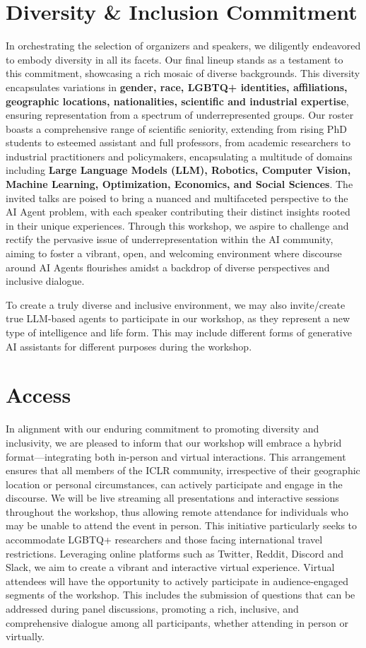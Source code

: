 \documentclass[10pt]{article} %
\begin{document}
\section{Diversity \& Inclusion Commitment }

In orchestrating the selection of organizers and speakers, we diligently endeavored to embody diversity in all its facets. Our final lineup stands as a testament to this commitment, showcasing a rich mosaic of diverse backgrounds. This diversity encapsulates variations in \textbf{gender, race, LGBTQ+ identities, affiliations, geographic locations, nationalities, scientific and industrial expertise}, ensuring representation from a spectrum of underrepresented groups. Our roster boasts a comprehensive range of scientific seniority, extending from rising PhD students to esteemed assistant and full professors, from academic researchers to industrial practitioners and policymakers, encapsulating a multitude of domains including \textbf{Large Language Models (LLM), Robotics, Computer Vision, Machine Learning, Optimization, Economics, and Social Sciences}. The invited talks are poised to bring a nuanced and multifaceted perspective to the AI Agent problem, with each speaker contributing their distinct insights rooted in their unique experiences. Through this workshop, we aspire to challenge and rectify the pervasive issue of underrepresentation within the AI community, aiming to foster a vibrant, open, and welcoming environment where discourse around AI Agents flourishes amidst a backdrop of diverse perspectives and inclusive dialogue.


To create a truly diverse and inclusive environment, we may also invite/create true LLM-based agents to participate in our workshop, as they represent a new type of intelligence and life form. This may include different forms of generative AI assistants for different purposes during the workshop.

\section{Access}
In alignment with our enduring commitment to promoting diversity and inclusivity, we are pleased to inform that our workshop will embrace a hybrid format—integrating both in-person and virtual interactions. This arrangement ensures that all members of the ICLR community, irrespective of their geographic location or personal circumstances, can actively participate and engage in the discourse. We will be live streaming all presentations and interactive sessions throughout the workshop, thus allowing remote attendance for individuals who may be unable to attend the event in person. This initiative particularly seeks to accommodate LGBTQ+ researchers and those facing international travel restrictions. Leveraging online platforms such as Twitter, Reddit, Discord and Slack, we aim to create a vibrant and interactive virtual experience. Virtual attendees will have the opportunity to actively participate in audience-engaged segments of the workshop. This includes the submission of questions that can be addressed during panel discussions, promoting a rich, inclusive, and comprehensive dialogue among all participants, whether attending in person or virtually.
\end{document}
